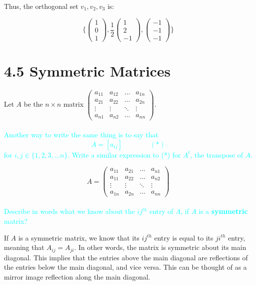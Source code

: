 \documentclass[fontsize=12pt]{scrartcl}
\begin{document}
\noindent
Thus, the orthogonal set ${v_1, v_2, v_3}$ is:

$$\{\left(\begin{array}{c} 1 \\ 0 \\ 1 \end{array} \right), \frac{1}{2}\left(\begin{array}{c} 1 \\ 2 \\ -1 \end{array} \right), \left(\begin{array}{c} -1 \\ -1 \\ -1 \end{array} \right)  \}$$

\newpage

\section{4.5 Symmetric Matrices}

\bigskip

Let $A$ be the $n \times n$ matrix $\left( \begin{array}{cccc} a_{11} & a_{12} & \ldots & a_{1n} \\
a_{21} & a_{22} & \ldots & a_{2n}\\
\vdots & \vdots & \ddots & \vdots\\
a_{n1} & a_{n2} & \ldots & a_{nn} \end{array}\right)$.\\
\\
\textcolor{cyan}{Another way to write the same thing is to say that $$A = \left[ a_{ij} \right] \ \ \ \ \ \ \ \ \ \ \ \ \ \ \ \ \ \ (*)$$ for $i,j \in \{1, 2, 3, \ldots n\}$. Write a similar expression to (*) for $A^t$, the transpose of $A$.}

$$A = \left( \begin{array}{cccc} a_{11} & a_{21} & \ldots & a_{n1} \\
a_{11} & a_{22} & \ldots & a_{n2}\\
\vdots & \vdots & \ddots & \vdots\\
a_{1n} & a_{2n} & \ldots & a_{nn} \end{array}\right) $$
\\

\noindent
\textcolor{cyan}{Describe in words what we know about the $ij^{th}$ entry of $A$, if $A$ is a \textbf{symmetric} matrix?}

\noindent
If $A$ is a symmetric matrix, we know that its $ij^{th}$ entry is equal to its $ji^{th}$ entry, meaning that $A_{ij} = A_{ji}$. In other words, the matrix is symmetric about its main diagonal. This implies that the entries above the main diagonal are reflections of the entries below the main diagonal, and vice versa. This can be thought of as a mirror image reflection along the main diagonal.
\\
\end{document}
